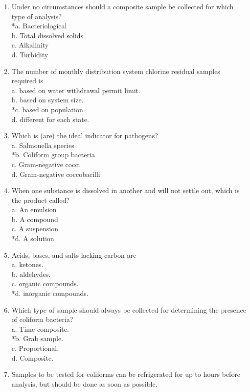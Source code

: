\begin{enumerate}[1.]
\item Under no circumstances should a composite sample be collected for which type of analysis?\\
*a. Bacteriological\\
b. Total dissolved solids\\
c. Alkalinity\\
d. Turbidity\\
\item The number of monthly distribution system chlorine residual samples required is\\
a. based on water withdrawal permit limit.\\
b. based on system size.\\
*c. based on population.\\
d. different for each state.\\
\item Which is (are) the ideal indicator for pathogens?\\
a. Salmonella species\\
*b. Coliform group bacteria\\
c. Gram-negative cocci\\
d. Gram-negative coccobacilli\\
\item When one substance is dissolved in another and will not settle out, which is the product called?\\
a. An emulsion\\
b. A compound\\
c. A suspension\\
*d. A solution
\item Acids, bases, and salts lacking carbon are\\
a. ketones.\\
b. aldehydes.\\
c. organic compounds.\\
*d. inorganic compounds.\\
\item Which type of sample should always be collected for determining the presence of coliform bacteria?\\
a. Time composite.\\
*b. Grab sample.\\
c. Proportional.\\
d. Composite.\\
\item Samples to be tested for coliforms can be refrigerated for up to hours before analysis, but should be done as soon as possible.\\

\end{enumerate}
